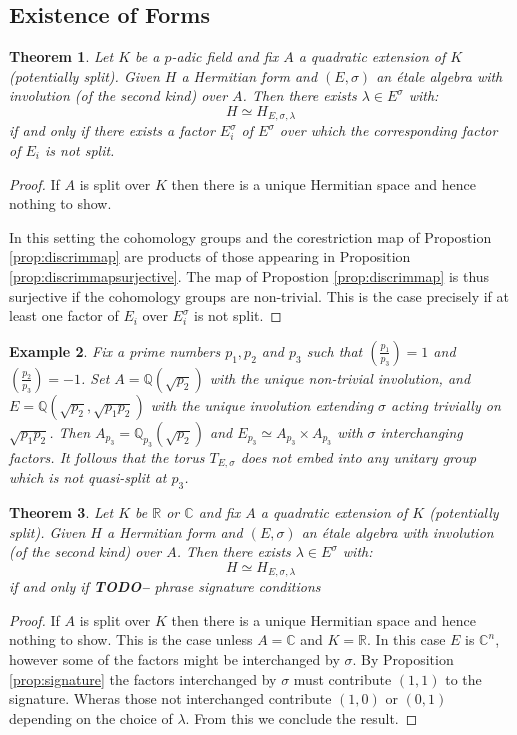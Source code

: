 \documentclass{article}
\theoremstyle{plain}
\newtheorem{theorem}{Theorem}[section]
\newtheorem{example}[theorem]{Example}
\theoremstyle{definition}
\newcommand{\RR}{\mathbb{R}}
\newcommand{\CC}{\mathbb{C}}
\newcommand{\QQ}{\mathbb{Q}}
\newcommand{\TODO}[1]{\textbf{TODO-#1}}
\begin{document}
\subsection{Existence of Forms}

\begin{theorem}
Let $K$ be a $p$-adic field and fix $A$ a quadratic extension of $K$ (potentially split).
Given $H$ a Hermitian form and $(E,\sigma)$ an \'etale algebra with involution (of the second kind) over $A$. Then there exists $\lambda \in E^\sigma$ with:
\[ H \simeq H_{E,\sigma,\lambda} \]
if and only if there exists a factor $E_i^\sigma$ of $E^\sigma$ over which the corresponding factor of $E_i$ is not split.
\end{theorem}
\begin{proof}
If $A$ is split over $K$ then there is a unique Hermitian space and hence nothing to show.

In this setting the cohomology groups and the corestriction map of Propostion \ref{prop:discrimmap} are products of those appearing in Proposition \ref{prop:discrimmapsurjective}. The map of Propostion \ref{prop:discrimmap} is thus surjective if the cohomology groups are non-trivial. This is the case precisely if at least one factor of $E_i$ over $E_i^\sigma$ is not split.
\end{proof}

\begin{example}
Fix a prime numbers $p_1,p_2$ and $p_3$ such that $\left(\tfrac{p_1}{p_3}\right) = 1$ and $\left(\tfrac{p_2}{p_3}\right) = -1$.
Set $A=\QQ(\sqrt{p_2})$ with the unique non-trivial involution, and $E=\QQ(\sqrt{p_2},\sqrt{p_1p_2})$ with the unique involution extending $\sigma$ acting trivially on $\sqrt{p_1p_2}$.
Then $A_{p_3} = \QQ_{p_3}(\sqrt{p_2})$ and $E_{p_3} \simeq A_{p_3} \times A_{p_3}$ with $\sigma$ interchanging factors.
It follows that the torus $T_{E,\sigma}$ does not embed into any unitary group which is not quasi-split at $p_3$.
\end{example}

\begin{theorem}
Let $K$ be $\RR$ or $\CC$ and fix $A$ a quadratic extension of $K$ (potentially split).
Given $H$ a Hermitian form and $(E,\sigma)$ an \'etale algebra with involution (of the second kind) over $A$. Then there exists $\lambda \in E^\sigma$ with:
\[ H \simeq H_{E,\sigma,\lambda} \]
if and only if 
\TODO - phrase signature conditions
\end{theorem}
\begin{proof}
If $A$ is split over $K$ then there is a unique Hermitian space and hence nothing to show.
This is the case unless $A=\CC$ and $K=\RR$. In this case $E$ is $\CC^n$, however some of the factors might be interchanged by $\sigma$.
By Proposition \ref{prop:signature} the factors interchanged by $\sigma$ must contribute $(1,1)$ to the signature.
Wheras those not interchanged contribute $(1,0)$ or $(0,1)$ depending on the choice of $\lambda$.
From this we conclude the result.
\end{proof}
\end{document}
